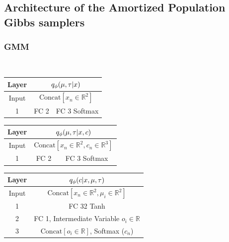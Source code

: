 \documentclass[anonymous=false, %
               format=acmsmall, %
               review=true, %
               screen=true, %
               nonacm=true]{acmart}
\theoremstyle{definition}
\begin{document}

\newpage
\subsection{Architecture of the Amortized Population Gibbs samplers}
\label{appendix:architecture}
\subsubsection{GMM}
\
\begin{table}[h]
    \centering
    \begin{tabular}{c|c|c}
    \toprule
     Layer 
     & 
    \multicolumn{2}{c}{$q_\phi(\mu, \tau | x)$}
    \\
    \midrule
    Input
    & 
    \multicolumn{2}{c}{$\mathrm{Concat}[x_n\in\mathbb{R}^2]$}
    \\
    \hline
    1
    & \parbox{3cm}{\centering FC 2}
    & \parbox{3cm}{\centering FC 3 Softmax}
    \\
    \bottomrule
    \end{tabular}
    \label{arch-gmm-rws}
\end{table}

\begin{table}[h]
    \centering
    \begin{tabular}{c|c|c}
    \toprule
     Layer 
     & 
    \multicolumn{2}{c}{$q_\phi(\mu, \tau | x, c)$}
    \\
    \midrule
    Input
    & 
    \multicolumn{2}{c}{$\mathrm{Concat}[x_n\in\mathbb{R}^2, c_n\in\mathbb{R}^3]$}
    \\
    \hline
    1
    & \parbox{3cm}{\centering FC 2}
    & \parbox{3cm}{\centering FC 3 Softmax}
    \\
    \bottomrule
    \end{tabular}
    \label{arch-gmm-global}
\end{table}

\begin{table}[h]
    \centering
    \begin{tabular}{c|c}
    \toprule
        Layer
        &
        $q_\phi(c | x, \mu, \tau)$
        \\
    \midrule
    Input
    & 
    $\mathrm{Concat}[x_n\in\mathbb{R}^2, \mu_i\in\mathbb{R}^2]$\\
    \hline
    1
    & \parbox{4cm}{\centering FC 32 Tanh}\\
    & FC 1, Intermediate Variable $o_i\in\mathbb{R}$ \\
    & $\mathrm{Concat}[o_i\in\mathbb{R}]$, Softmax ($c_n$) \\
    \bottomrule
    \end{tabular}
    \label{arch-gmm-local}
\end{table}
\end{document}
